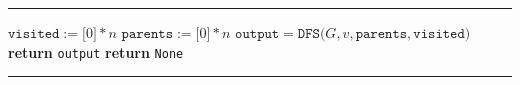 \documentclass[14pt]{extreport}
\newenvironment{nocaptionalg} %
{
    \par\addvspace{\topsep}
    \centering
    \begin{minipage}{\linewidth}
    \hrule\kern2pt
}
{
    \par\kern2pt\hrule
    \end{minipage}
    \par\addvspace{\topsep}
}
\theoremstyle{definition}
\theoremstyle{definition}
\begin{document}
\begin{nocaptionalg}
    \begin{algorithmic}[1]
            \State $\texttt{visited} := \texttt{[}0\texttt{]} * n$
            \State $\texttt{parents} := \texttt{[}0\texttt{]} * n$
                \State $\texttt{output} = \texttt{DFS(}G, v, \texttt{parents}, \texttt{visited)}$
                        \State \textbf{return} \texttt{output}
                    \EndIf
                \EndIf
            \EndFor
            \State \textbf{return} \texttt{None}
        \EndFunction
    \end{algorithmic}
\end{nocaptionalg}
\end{document}
